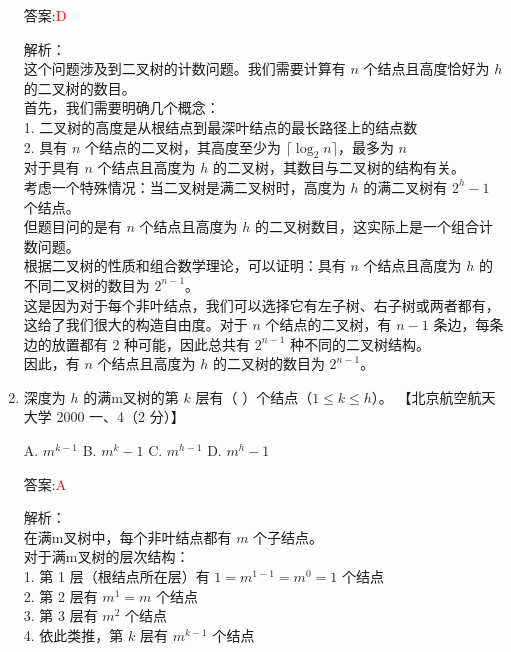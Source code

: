 \documentclass[lang=cn,newtx,10pt,scheme=chinese]{../../../elegantbook}
\begin{document}
\begin{enumerate}
    答案:\textcolor{red}{D}
    
    解析：\\
    这个问题涉及到二叉树的计数问题。我们需要计算有 $n$ 个结点且高度恰好为 $h$ 的二叉树的数目。\\
    
    首先，我们需要明确几个概念：\\
    1. 二叉树的高度是从根结点到最深叶结点的最长路径上的结点数\\
    2. 具有 $n$ 个结点的二叉树，其高度至少为 $\lceil \log_2 n \rceil$，最多为 $n$\\
    
    对于具有 $n$ 个结点且高度为 $h$ 的二叉树，其数目与二叉树的结构有关。\\
    
    考虑一个特殊情况：当二叉树是满二叉树时，高度为 $h$ 的满二叉树有 $2^h - 1$ 个结点。\\
    
    但题目问的是有 $n$ 个结点且高度为 $h$ 的二叉树数目，这实际上是一个组合计数问题。\\
    
    根据二叉树的性质和组合数学理论，可以证明：具有 $n$ 个结点且高度为 $h$ 的不同二叉树的数目为 $2^{n-1}$。\\
    
    这是因为对于每个非叶结点，我们可以选择它有左子树、右子树或两者都有，这给了我们很大的构造自由度。对于 $n$ 个结点的二叉树，有 $n-1$ 条边，每条边的放置都有 2 种可能，因此总共有 $2^{n-1}$ 种不同的二叉树结构。\\
    
    因此，有 $n$ 个结点且高度为 $h$ 的二叉树的数目为 $2^{n-1}$。\\

    \item 深度为 $h$ 的满m叉树的第 $k$ 层有（ ）个结点（$1 \leq k \leq h$）。  
    【北京航空航天大学 2000 一、4（2 分）】  
    
    A. $m^{k-1}$ \quad B. $m^{k} - 1$ \quad C. $m^{h-1}$ \quad D. $m^{h} - 1$  

    答案:\textcolor{red}{A}
    
    解析：\\
    在满m叉树中，每个非叶结点都有 $m$ 个子结点。\\
    
    对于满m叉树的层次结构：\\
    1. 第 1 层（根结点所在层）有 $1 = m^{1-1} = m^0 = 1$ 个结点\\
    2. 第 2 层有 $m^1 = m$ 个结点\\
    3. 第 3 层有 $m^2$ 个结点\\
    4. 依此类推，第 $k$ 层有 $m^{k-1}$ 个结点\\
    

\end{enumerate}
\end{document}
